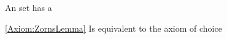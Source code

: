 \begin{thm}
\label{Axiom:ZornsLemma}
An \InductivelyOrdered set has a \Maximum
\end{thm}
\begin{rmk}\ref{Axiom:ZornsLemma} Is equivalent to the axiom of choice
\end{rmk}
